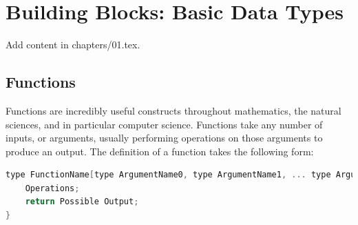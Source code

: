 \chapter{Building Blocks: Basic Data Types}
\lstset{style=BrenMat}

Add content in chapters/01.tex.

\section{Functions}

Functions are incredibly useful constructs throughout mathematics, the natural sciences, and in particular
computer science. Functions take any number of inputs, or arguments, usually performing operations on those arguments to
produce an output. The definition of a function takes the following form:
\begin{center}
\begin{lstlisting}[language=C,caption=Function Example,label=lst:funcEx]
type FunctionName[type ArgumentName0, type ArgumentName1, ... type ArgumentNameN]{
	Operations;
	return Possible Output;
}
\end{lstlisting}
\end{center}

